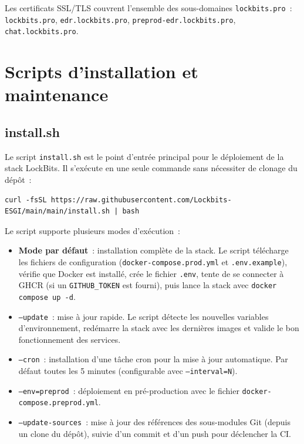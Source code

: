 Les certificats SSL/TLS couvrent l'ensemble des sous-domaines
\texttt{lockbits.pro}~:
\texttt{lockbits.pro}, \texttt{edr.lockbits.pro},
\texttt{preprod-edr.lockbits.pro}, \texttt{chat.lockbits.pro}.

\section{Scripts d'installation et maintenance}

\subsection{install.sh}

Le script \texttt{install.sh} est le point d'entrée principal pour le
déploiement de la stack LockBits. Il s'exécute en une seule commande sans
nécessiter de clonage du dépôt~:

\begin{lstlisting}[language=dockerbash, caption={Commande d'installation one-liner}, label={lst:install-oneliner}]
curl -fsSL https://raw.githubusercontent.com/Lockbits-ESGI/main/main/install.sh | bash
\end{lstlisting}

Le script supporte plusieurs modes d'exécution~:

\begin{itemize}
  \item \textbf{Mode par défaut}~: installation complète de la stack. Le script
    télécharge les fichiers de configuration (\texttt{docker-compose.prod.yml}
    et \texttt{.env.example}), vérifie que Docker est installé, crée le fichier
    \texttt{.env}, tente de se connecter à GHCR (si un \texttt{GITHUB\_TOKEN}
    est fourni), puis lance la stack avec \texttt{docker compose up -d}.
  \item \texttt{--update}~: mise à jour rapide. Le script détecte les nouvelles
    variables d'environnement, redémarre la stack avec les dernières images et
    valide le bon fonctionnement des services.
  \item \texttt{--cron}~: installation d'une tâche cron pour la mise à jour
    automatique. Par défaut toutes les 5 minutes (configurable avec
    \texttt{--interval=N}).
  \item \texttt{--env=preprod}~: déploiement en pré-production avec le fichier
    \texttt{docker-compose.preprod.yml}.
  \item \texttt{--update-sources}~: mise à jour des références des sous-modules
    Git (depuis un clone du dépôt), suivie d'un commit et d'un push pour
    déclencher la CI.
\end{itemize}

